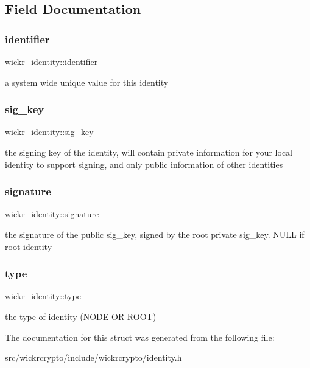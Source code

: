 \subsection{Field Documentation}
\mbox{\label{structwickr__identity_aed3657b22d83bb810b51ea1d1520b23e}} 
\subsubsection{\texorpdfstring{identifier}{identifier}}
{\footnotesize\ttfamily wickr\+\_\+identity\+::identifier}

a system wide unique value for this identity \mbox{\label{structwickr__identity_a788a08ac03576cb76d9b2eaf81a7af3e}} 
\subsubsection{\texorpdfstring{sig\_key}{sig\_key}}
{\footnotesize\ttfamily wickr\+\_\+identity\+::sig\+\_\+key}

the signing key of the identity, will contain private information for your local identity to support signing, and only public information of other identities \mbox{\label{structwickr__identity_afb6bd9f5f9707be10fb273ce8d0b5928}} 
\subsubsection{\texorpdfstring{signature}{signature}}
{\footnotesize\ttfamily wickr\+\_\+identity\+::signature}

the signature of the public \textquotesingle{}sig\+\_\+key\textquotesingle{}, signed by the root private \textquotesingle{}sig\+\_\+key\textquotesingle{}. N\+U\+LL if root identity \mbox{\label{structwickr__identity_a685dae977849c05c84ee4a0b10c9396d}} 
\subsubsection{\texorpdfstring{type}{type}}
{\footnotesize\ttfamily wickr\+\_\+identity\+::type}

the type of identity (N\+O\+DE OR R\+O\+OT) 

The documentation for this struct was generated from the following file\+:\begin{DoxyCompactItemize}
\item 
src/wickrcrypto/include/wickrcrypto/identity.\+h\end{DoxyCompactItemize}
